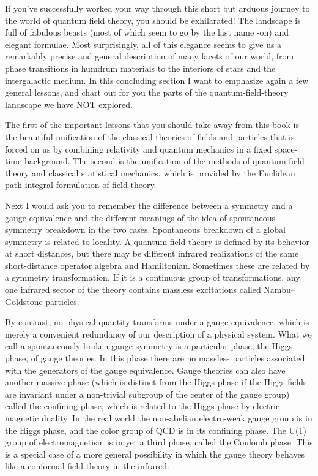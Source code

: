 
If you've successfully worked your way through this short but arduous journey to the
world of quantum field theory, you should be exhilarated! The landscape is full of
fabulous beasts (most of which seem to go by the last name -on) and elegant formulae.
Most surprisingly, all of this elegance seems to give us a remarkably precise and general
description of many facets of our world, from phase transitions in humdrum materials
to the interiors of stars and the intergalactic medium. In this concluding section I
want to emphasize again a few general lessons, and chart out for you the parts of the
quantum-field-theory landscape we have NOT explored.

The first of the important lessons that you should take away from this book is the
beautiful unification of the classical theories of fields and particles that is forced on
us by combining relativity and quantum mechanics in a fixed space-time background.
The second is the unification of the methods of quantum field theory and classical
statistical mechanics, which is provided by the Euclidean path-integral formulation of
field theory.

Next I would ask you to remember the difference between a symmetry and a gauge
equivalence and the different meanings of the idea of spontaneous symmetry breakdown
in the two cases. Spontaneous breakdown of a global symmetry is related to locality. A
quantum field theory is defined by its behavior at short distances, but there may be different
infrared realizations of the same short-distance operator algebra and Hamiltonian.
Sometimes these are related by a symmetry transformation. If it is a continuous group
of transformations, any one infrared sector of the theory contains massless excitations
called Nambu--Goldstone particles.

By contrast, no physical quantity transforms under a gauge equivalence, which is
merely a convenient redundancy of our description of a physical system. What we call
a spontaneously broken gauge symmetry is a particular phase, the Higgs phase, of gauge
theories. In this phase there are no massless particles associated with the generators
of the gauge equivalence. Gauge theories can also have another massive phase (which
is distinct from the Higgs phase if the Higgs fields are invariant under a non-trivial
subgroup of the center of the gauge group) called the confining phase, which is related
to the Higgs phase by electric--magnetic duality. In the real world the non-abelian
electro-weak gauge group is in the Higgs phase, and the color group of QCD is in its
confining phase. The U(1) group of electromagnetism is in yet a third phase, called the
Coulomb phase. This is a special case of a more general possibility in which the gauge
theory behaves like a conformal field theory in the infrared.

